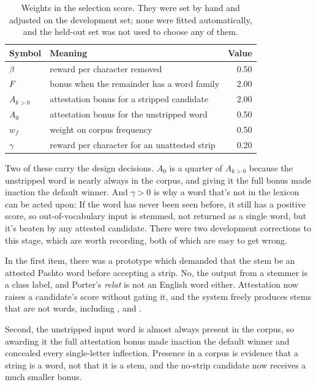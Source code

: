 \documentclass[conference]{IEEEtran}
\newcommand{\ps}[1]{{\pashtofont\textpashto{#1}}}
\begin{document}
\begin{table}[t]
\caption{Weights in the selection score. They were set by hand and adjusted on
the development set; none were fitted automatically, and the held-out set was
not used to choose any of them.}
\label{tab:weights}
\centering
\begin{tabular}{llr}
\toprule
Symbol & Meaning & Value\\
\midrule
$\beta$   & reward per character removed & 0.50\\
$F$       & bonus when the remainder has a word family & 2.00\\
$A_{k>0}$ & attestation bonus for a stripped candidate & 2.00\\
$A_{0}$   & attestation bonus for the unstripped word & 0.50\\
$w_f$     & weight on corpus frequency & 0.50\\
$\gamma$  & reward per character for an unattested strip & 0.20\\
\bottomrule
\end{tabular}
\end{table}

Two of these carry the design decisions. $A_0$ is a quarter of $A_{k>0}$
because the unstripped word is nearly always in the corpus, and giving it the
full bonus made inaction the default winner. And $\gamma>0$ is why a word that's not in
the lexicon can be acted upon: If the word has never been seen before, it still
has a positive score, so out-of-vocabulary input is stemmed, not returned as a
single word, but it's beaten by any attested candidate. There were two
development corrections to this stage, which are worth recording, both of which
are easy to get wrong.

In the first item, there was a prototype which demanded that the stem be an
attested Pashto word before accepting a strip. No, the output from a stemmer is
a class label, and Porter's \emph{relat} is not an English word either. Attestation now
raises a candidate's score without gating it, and the system freely produces
stems that are not words, including \ps{ښوون}, \ps{لوبغاړ} and \ps{پوهن}.

Second, the unstripped input word is almost always present in the corpus, so
awarding it the full attestation bonus made inaction the default winner and
concealed every single-letter inflection. Presence in a corpus is evidence
that a string is a word, not that it is a stem, and the no-strip candidate now
receives a much smaller bonus.
\end{document}
